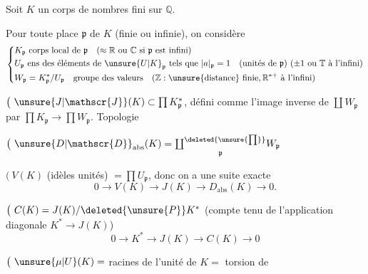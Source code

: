 Soit $K$ un corps de nombres fini sur $\mathbb Q$.

Pour toute place $\mathfrak p$ de $K$ (finie ou infinie), on considère
\[
\left\{\begin{aligned}
&K_{\mathfrak p}\ \text{corps local de }\mathfrak p\quad(\approx\mathbb R\text{ ou }\mathbb C\text{ si }\mathfrak p\text{ est infini})\\
&U_{\mathfrak p}\ \text{ens des éléments de }{\unsure{U|K}}_{\mathfrak p}\text{ tels que }|a|_{\mathfrak p}=1\quad(\text{unités de }\mathfrak p)\ (\pm1\text{ ou }\mathbb T\text{ à l'infini})\\
&W_{\mathfrak p}=K_{\mathfrak p}^*/U_{\mathfrak p}\quad\text{groupe des valeurs}\quad(\mathbb Z:\text{\unsure{distance} finie},\mathbb R^{*+}\text{ à l'infini})
\end{aligned}\right.
\]

$\bigl(\ \unsure{J|\mathscr{J}}(K)\subset\prod K_{\mathfrak p}^*$, défini comme l'image inverse de $\coprod W_{\mathfrak p}$ par $\prod K_{\mathfrak p}\longrightarrow\prod W_{\mathfrak p}$. Topologie

$\bigl(\ {\unsure{D|\mathscr{D}}}_{\mathrm{abs}}(K)=\underset{\mathfrak p}{\coprod^{\deleted{\unsure{\prod}}}}W_{\mathfrak p}$

$\bigl(\ V(K)$ (idèles unités) $=\prod U_{\mathfrak p}$, donc on a une suite exacte
\[
0\longrightarrow V(K)\longrightarrow J(K)\longrightarrow D_{\mathrm{abs}}(K)\longrightarrow0.
\]


$\bigl(\ C(K)=J(K)/\deleted{\unsure{P}}K^*$ (compte tenu de l'application diagonale $K^*\longrightarrow J(K)$)
\[
0\longrightarrow K^*\longrightarrow J(K)\longrightarrow C(K)\longrightarrow0
\]

$\bigl(\ \unsure{\mu|U}(K)=$ racines de l'unité de $K=$ torsion de



